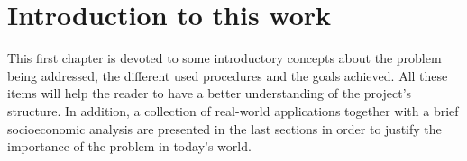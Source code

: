 \chapter{Introduction to this work}

This first chapter is devoted to some introductory concepts about the problem
being addressed, the different used procedures and the goals achieved. All these
items will help the reader to have a better understanding of the project's
structure. In addition, a collection of real-world applications together with a
brief socioeconomic analysis are presented in the last sections in order to
justify the importance of the problem in today's world.





